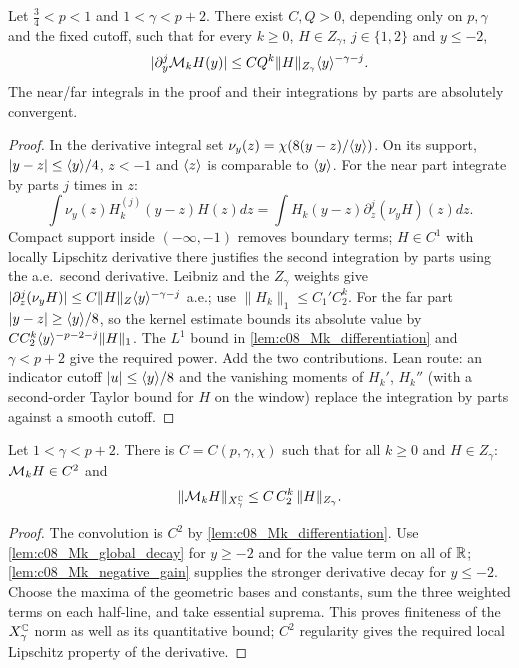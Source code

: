 \begin{lemma}
  \label{lem:c08_Mk_negative_gain}
  Let $\frac34<p<1$ and $1<\gamma<p+2$. There exist $C,Q>0$, depending only on $p,\gamma$ and the fixed
  cutoff, such that for every $k\ge0$, $H\in Z_\gamma$, $j\in\{1,2\}$ and $y\le-2$,
  \[
    |\partial_y^j\mathcal{M}_kH(y)|\le C Q^k\|H\|_{Z_\gamma}\langle y \rangle^{-\gamma-j}.
  \]
  The near/far integrals in the proof and their integrations by parts are absolutely convergent.
\end{lemma}
\begin{proof}
  In the derivative integral set $\nu_y(z)=\chi(8(y-z)/\langle y \rangle)$.
  On its support, $|y-z|\le\langle y \rangle/4$, $z<-1$ and $\langle z \rangle$ is comparable to $\langle y \rangle$.
  For the near part integrate by parts $j$ times in $z$:
  \[
    \int\nu_y(z)H_k^{(j)}(y-z)H(z)dz
      =\int H_k(y-z)\partial_z^j(\nu_yH)(z)dz.
  \]
  Compact support inside $(-\infty,-1)$ removes boundary terms; $H\in C^1$ with locally Lipschitz
  derivative there justifies the second integration by parts using the a.e.\ second derivative.
  Leibniz and the $Z_\gamma$ weights give
  $|\partial_z^j(\nu_yH)|\le C\|H\|_Z\langle y \rangle^{-\gamma-j}$ a.e.; use $\|H_k\|_1\le C_1'C_2^k$.
  For the far part $|y-z|\ge\langle y \rangle/8$, so the kernel estimate bounds its absolute value by
  $C C_2^k\langle y \rangle^{-p-2-j}\|H\|_1$. The $L^1$ bound in \cref{lem:c08_Mk_differentiation} and
  $\gamma<p+2$ give the required power. Add the two contributions.
  Lean route: an indicator cutoff $|u|\le\langle y \rangle/8$ and the vanishing moments of $H_k'$, $H_k''$ (with a second-order Taylor bound for $H$ on the window) replace the integration by parts against a smooth cutoff.
\end{proof}

\begin{lemma}
  \label{lem:c08_Mk_bound}
  Let $1<\gamma<p+2$. There is $C=C(p,\gamma,\chi)$ such that for all $k\ge0$ and $H\in Z_\gamma$: $\mathcal{M}_kH\in C^2$ and
  \begin{equation}\label{eqn:linear_Hk_bound}
    \|\mathcal{M}_kH\|_{X^{\mathbb{C}}_\gamma}\le C\,C_2^k\,\|H\|_{Z_\gamma}.
  \end{equation}
\end{lemma}
\begin{proof}
  The convolution is $C^2$ by \cref{lem:c08_Mk_differentiation}. Use
  \cref{lem:c08_Mk_global_decay} for $y\ge-2$ and for the value term on all of $\mathbb{R}$;
  \cref{lem:c08_Mk_negative_gain} supplies the stronger derivative decay for $y\le-2$.
  Choose the maxima of the geometric bases and constants, sum the three weighted terms on each
  half-line, and take essential suprema. This proves finiteness of the $X^{\mathbb{C}}_\gamma$ norm as well as its
  quantitative bound; $C^2$ regularity gives the required local Lipschitz property of the derivative.
\end{proof}

